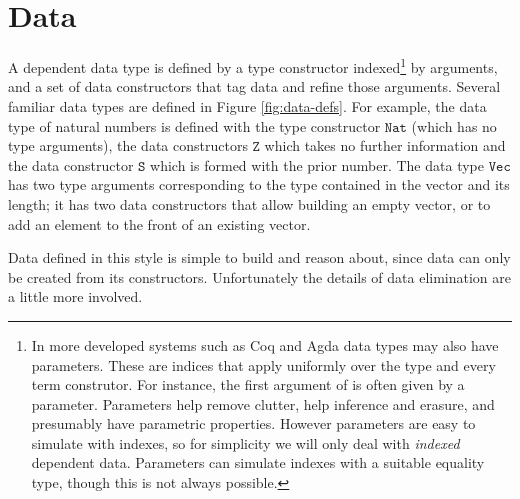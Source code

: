 \section{Data}


A dependent data type is defined by a type constructor indexed\footnote{
 In more developed systems such as Coq and Agda data types may also have parameters.
 These are indices that apply uniformly over the type and every term construtor.
 For instance, the first argument of \Vect{} is often given by a parameter.
 Parameters help remove clutter, help inference and erasure, and presumably have parametric properties\cite{10.1145/99370.99404}.
 However parameters are easy to simulate with indexes, so for simplicity we will only deal with \emph{indexed} dependent data.
 Parameters can simulate indexes with a suitable equality type\cite{sjoberg2012irrelevance}, though this is not always possible\cite[Section 8]{bertrand:hal-02896776}.
} by arguments, and a set of data constructors that tag data and refine those arguments.
Several familiar data types are defined in Figure \ref{fig:data-defs}.
For example, the data type of natural numbers is defined with the type constructor $\mathtt{Nat}$ (which has no type arguments), the data constructors $\mathtt{Z}$ which takes no further information and the data constructor $\mathtt{S}$ which is formed with the prior number.
The data type $\mathtt{Vec}$ has two type arguments corresponding to the type contained in the vector and its length; it has two data constructors that allow building an empty vector, or to add an element to the front of an existing vector.

Data defined in this style is simple to build and reason about, since data can only be created from its constructors.
Unfortunately the details of data elimination are a little more involved.

